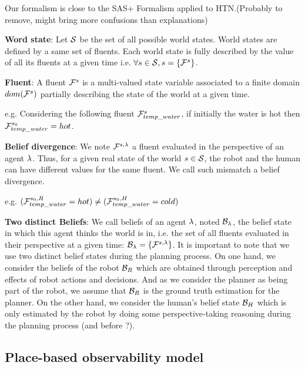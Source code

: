 \documentclass[letterpaper]{article} %
\begin{document}
Our formalism is close to the SAS+ Formalism applied to HTN.(Probably to remove, might bring more confusions than explanations)

\textbf{Word state}: 
Let $\mathcal{S}$ be the set of all possible world states. World states are defined by a same set of fluents. Each world state is fully described by the value of all its fluents at a given time i.e. $\forall s\in\mathcal{S}, s=\{ \mathcal{F}^{s}_{} \}$.

\textbf{Fluent}: 
A fluent $\mathcal{F}^{s}_{}$ is a multi-valued state variable associated to a finite domain $dom(\mathcal{F}^{s}_{})$ partially describing the state of the world at a given time.


e.g. Considering the following fluent $\mathcal{F}^{s}_{temp\_water}$, if initially the water is hot then $\mathcal{F}^{s_0}_{temp\_water}=hot$.

\textbf{Belief divergence}: 
We note $\mathcal{F}^{s,\lambda}_{}$ a fluent evaluated in the perspective of an agent $\lambda$. Thus, for a given real state of the world $s\in\mathcal{S}$, the robot and the human can have different values for the same fluent. We call such mismatch a belief divergence.

e.g. $(\mathcal{F}^{s_0,R}_{temp\_water}{}=hot) \neq (\mathcal{F}^{s_0,H}_{temp\_water}=cold)$

\textbf{Two distinct Beliefs}: 
We call beliefs of an agent $\lambda$, noted $\mathcal{B}_\lambda$, the belief state in which this agent thinks the world is in, i.e. the set of all fluents evaluated in their perspective at a given time: $\mathcal{B}_\lambda=\{ \mathcal{F}^{s,\lambda}_{} \}$. It is important to note that we use two distinct belief states during the planning process. On one hand, we consider the beliefs of the robot $\mathcal{B}_R$ which are obtained through perception and effects of robot actions and decisions. And as we consider the planner as being part of the robot, we assume that $\mathcal{B}_R$ is the ground truth estimation for the planner. On the other hand, we consider the human's belief state $\mathcal{B}_H$ which is only estimated by the robot by doing some perspective-taking reasoning during the planning process (and before ?).

\subsection{Place-based observability model}
\end{document}
